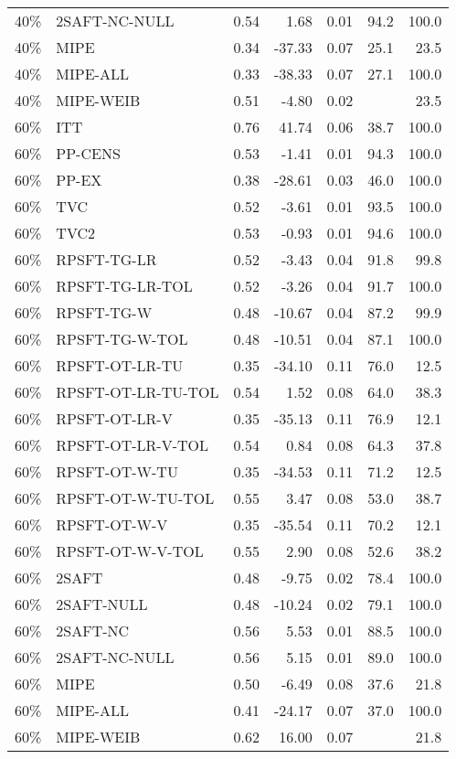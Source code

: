 \begin{table}[ht]
{\begin{tabular}{llrrrrr}
  40\% & 2SAFT-NC-NULL & 0.54 & 1.68 & 0.01 & 94.2 & 100.0 \\ 
  40\% & MIPE & 0.34 & -37.33 & 0.07 & 25.1 & 23.5 \\ 
  40\% & MIPE-ALL & 0.33 & -38.33 & 0.07 & 27.1 & 100.0 \\ 
  40\% & MIPE-WEIB & 0.51 & -4.80 & 0.02 &  & 23.5 \\ 
   \hline
60\% & ITT & 0.76 & 41.74 & 0.06 & 38.7 & 100.0 \\ 
  60\% & PP-CENS & 0.53 & -1.41 & 0.01 & 94.3 & 100.0 \\ 
  60\% & PP-EX & 0.38 & -28.61 & 0.03 & 46.0 & 100.0 \\ 
  60\% & TVC & 0.52 & -3.61 & 0.01 & 93.5 & 100.0 \\ 
  60\% & TVC2 & 0.53 & -0.93 & 0.01 & 94.6 & 100.0 \\ 
   \hline
60\% & RPSFT-TG-LR & 0.52 & -3.43 & 0.04 & 91.8 & 99.8 \\ 
  60\% & RPSFT-TG-LR-TOL & 0.52 & -3.26 & 0.04 & 91.7 & 100.0 \\ 
  60\% & RPSFT-TG-W & 0.48 & -10.67 & 0.04 & 87.2 & 99.9 \\ 
  60\% & RPSFT-TG-W-TOL & 0.48 & -10.51 & 0.04 & 87.1 & 100.0 \\ 
  60\% & RPSFT-OT-LR-TU & 0.35 & -34.10 & 0.11 & 76.0 & 12.5 \\ 
  60\% & RPSFT-OT-LR-TU-TOL & 0.54 & 1.52 & 0.08 & 64.0 & 38.3 \\ 
  60\% & RPSFT-OT-LR-V & 0.35 & -35.13 & 0.11 & 76.9 & 12.1 \\ 
  60\% & RPSFT-OT-LR-V-TOL & 0.54 & 0.84 & 0.08 & 64.3 & 37.8 \\ 
   \hline
60\% & RPSFT-OT-W-TU & 0.35 & -34.53 & 0.11 & 71.2 & 12.5 \\ 
  60\% & RPSFT-OT-W-TU-TOL & 0.55 & 3.47 & 0.08 & 53.0 & 38.7 \\ 
  60\% & RPSFT-OT-W-V & 0.35 & -35.54 & 0.11 & 70.2 & 12.1 \\ 
  60\% & RPSFT-OT-W-V-TOL & 0.55 & 2.90 & 0.08 & 52.6 & 38.2 \\ 
   \hline
60\% & 2SAFT & 0.48 & -9.75 & 0.02 & 78.4 & 100.0 \\ 
  60\% & 2SAFT-NULL & 0.48 & -10.24 & 0.02 & 79.1 & 100.0 \\ 
  60\% & 2SAFT-NC & 0.56 & 5.53 & 0.01 & 88.5 & 100.0 \\ 
  60\% & 2SAFT-NC-NULL & 0.56 & 5.15 & 0.01 & 89.0 & 100.0 \\ 
  60\% & MIPE & 0.50 & -6.49 & 0.08 & 37.6 & 21.8 \\ 
  60\% & MIPE-ALL & 0.41 & -24.17 & 0.07 & 37.0 & 100.0 \\ 
  60\% & MIPE-WEIB & 0.62 & 16.00 & 0.07 &  & 21.8 \\ 
   \hline
\end{tabular}
}
\end{table}
